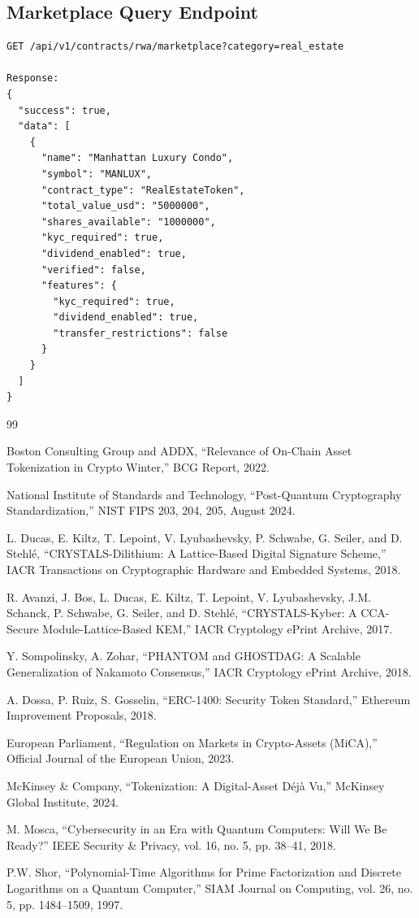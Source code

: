 \documentclass[11pt,a4paper,twoside]{article}
\begin{document}
\subsection{Marketplace Query Endpoint}

\begin{lstlisting}[style=rustcode, caption={RWA Marketplace Query API}]
GET /api/v1/contracts/rwa/marketplace?category=real_estate

Response:
{
  "success": true,
  "data": [
    {
      "name": "Manhattan Luxury Condo",
      "symbol": "MANLUX",
      "contract_type": "RealEstateToken",
      "total_value_usd": "5000000",
      "shares_available": "1000000",
      "kyc_required": true,
      "dividend_enabled": true,
      "verified": false,
      "features": {
        "kyc_required": true,
        "dividend_enabled": true,
        "transfer_restrictions": false
      }
    }
  ]
}
\end{lstlisting}

\newpage
\begin{thebibliography}{99}

Boston Consulting Group and ADDX,
``Relevance of On-Chain Asset Tokenization in Crypto Winter,''
BCG Report, 2022.

National Institute of Standards and Technology,
``Post-Quantum Cryptography Standardization,''
NIST FIPS 203, 204, 205, August 2024.

L. Ducas, E. Kiltz, T. Lepoint, V. Lyubashevsky, P. Schwabe, G. Seiler, and D. Stehl\'{e},
``CRYSTALS-Dilithium: A Lattice-Based Digital Signature Scheme,''
IACR Transactions on Cryptographic Hardware and Embedded Systems, 2018.

R. Avanzi, J. Bos, L. Ducas, E. Kiltz, T. Lepoint, V. Lyubashevsky, J.M. Schanck, P. Schwabe, G. Seiler, and D. Stehl\'{e},
``CRYSTALS-Kyber: A CCA-Secure Module-Lattice-Based KEM,''
IACR Cryptology ePrint Archive, 2017.

Y. Sompolinsky, A. Zohar,
``PHANTOM and GHOSTDAG: A Scalable Generalization of Nakamoto Consensus,''
IACR Cryptology ePrint Archive, 2018.

A. Dossa, P. Ruiz, S. Gosselin,
``ERC-1400: Security Token Standard,''
Ethereum Improvement Proposals, 2018.

European Parliament,
``Regulation on Markets in Crypto-Assets (MiCA),''
Official Journal of the European Union, 2023.

McKinsey \& Company,
``Tokenization: A Digital-Asset D\'{e}j\`{a} Vu,''
McKinsey Global Institute, 2024.

M. Mosca,
``Cybersecurity in an Era with Quantum Computers: Will We Be Ready?''
IEEE Security \& Privacy, vol. 16, no. 5, pp. 38--41, 2018.

P.W. Shor,
``Polynomial-Time Algorithms for Prime Factorization and Discrete Logarithms on a Quantum Computer,''
SIAM Journal on Computing, vol. 26, no. 5, pp. 1484--1509, 1997.

\end{thebibliography}
\end{document}
